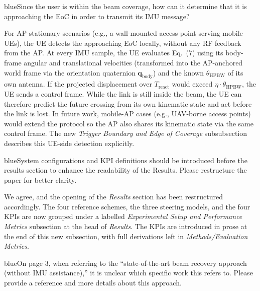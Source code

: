 \documentclass{article}
\newcommand{\blue}[1]{\begin{color}{blue}#1\end{color}}
\begin{document}
\begin{tcbremark}
{\selectfont
\blue{Since the user is within the beam coverage, how can it determine that it is approaching the EoC in order to transmit its IMU message?}
}
\end{tcbremark}

\noindent For AP-stationary scenarios (e.g., a wall-mounted access point serving mobile UEs), the UE detects the approaching EoC locally, without any RF feedback from the AP. At every IMU sample, the UE evaluates Eq.~(7) using its body-frame angular and translational velocities (transformed into the AP-anchored world frame via the orientation quaternion $\mathbf{q}_{\text{body}}$) and the known $\theta_{\text{HPBW}}$ of its own antenna. If the projected displacement over $T_{\text{react}}$ would exceed $\eta \cdot \theta_{\text{HPBW}}$, the UE sends a control frame. While the link is still inside the beam, the UE can therefore predict the future crossing from its own kinematic state and act before the link is lost. In future work, mobile-AP cases (e.g., UAV-borne access points) would extend the protocol so the AP also shares its kinematic state via the same control frame. The new \emph{Trigger Boundary and Edge of Coverage} subsubsection describes this UE-side detection explicitly.

\begin{tcbremark}
{\selectfont
\blue{System configurations and KPI definitions should be introduced before the results section to enhance the readability of the Results. Please restructure the paper for better clarity.}
}
\end{tcbremark}

\noindent We agree, and the opening of the \emph{Results} section has been restructured accordingly. The four reference schemes, the three steering models, and the four KPIs are now grouped under a labelled \emph{Experimental Setup and Performance Metrics} subsection at the head of \emph{Results}. The KPIs are introduced in prose at the end of this new subsection, with full derivations left in \emph{Methods/Evaluation Metrics}.

\begin{tcbremark}
{\selectfont
\blue{On page 3, when referring to the ``state-of-the-art beam recovery approach (without IMU assistance),'' it is unclear which specific work this refers to. Please provide a reference and more details about this approach.}
}
\end{tcbremark}
\end{document}
